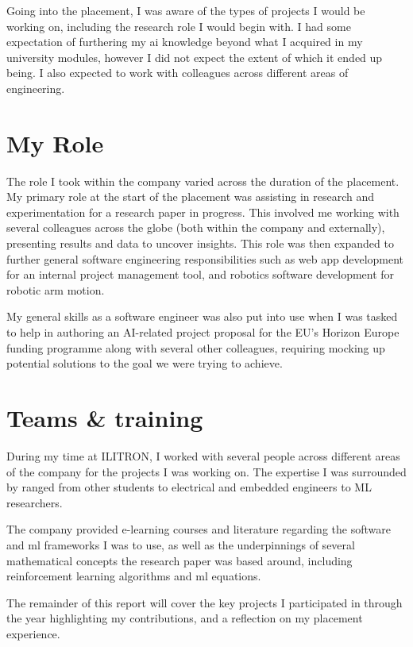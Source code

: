 Going into the placement, I was aware of the types of projects I would be working on,
including the research role I would begin with.
I had some expectation of furthering my \gls*{ai} knowledge beyond what I acquired in
my university modules, however I did not expect the extent of which it ended up being.
I also expected to work with colleagues across different areas of engineering.

\section{My Role}

The role I took within the company varied across the duration of the placement.
My primary role at the start of the placement was assisting in research and experimentation
for a research paper in progress. This involved me working with several colleagues across the globe
(both within the company and externally), presenting results and data to uncover insights.
This role was then expanded to further general software engineering responsibilities such as
web app development for an internal project management tool,
and robotics software development for robotic arm motion.

My general skills as a software engineer was also put into use when I was tasked to help
in authoring an AI-related project proposal for the EU's Horizon Europe funding programme
along with several other colleagues, requiring mocking up potential solutions
to the goal we were trying to achieve.

\section{Teams \& training}

During my time at ILITRON, I worked with several people across different areas of the company
for the projects I was working on. The expertise I was surrounded by ranged from other students
to electrical and embedded engineers to ML researchers.

The company provided e-learning courses and literature regarding the software and \gls*{ml} frameworks
I was to use, as well as the underpinnings of several mathematical concepts
the research paper was based around, including reinforcement learning algorithms and \gls*{ml} equations.

The remainder of this report will cover the key projects I participated in through the year
highlighting my contributions, and a reflection on my placement experience.
